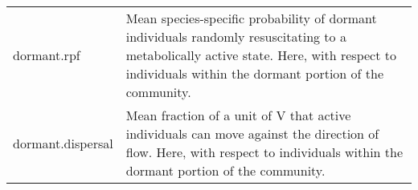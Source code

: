 \documentclass[12pt]{article}
\begin{document}
\begin{longtable}{| p{} | p{} |}
dormant.rpf & Mean species-specific probability of dormant individuals randomly resuscitating to a metabolically active state. Here, with respect to individuals within the dormant portion of the community. \\[6pt]

dormant.dispersal & Mean fraction of a unit of V that active individuals can move against the direction of flow. Here, with respect to individuals within the dormant portion of the community. \\[6pt]

\end{longtable}
\end{document}
